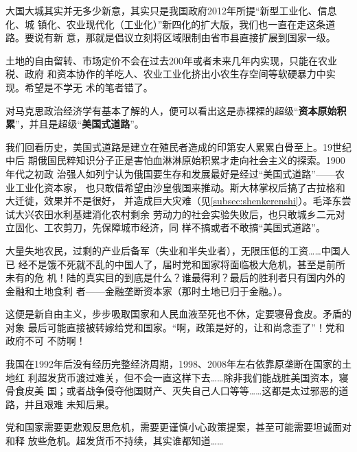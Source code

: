 大国大城其实并无多少新意，其实只是我国政府2012年所提“新型工业化、信息化、城
镇化、农业现代化（工业化）”新四化的扩大版，我们也一直在走这条道路。要说有新
意，那就是倡议立刻将区域限制由省市县直接扩展到国家一级。

土地的自由留转、市场定价不会在过去200年或者未来几年内实现，只能在农业税、政府
和资本协作的羊吃人、农业工业化挤出小农生存空间等软硬暴力中实现。希望是不学无
术的笔者错了。

对马克思政治经济学有基本了解的人，便可以看出这是赤裸裸的超级“\textbf{资本原始积
累}”，并且是超级“\textbf{美国式道路}”。

我们回看历史，美国式道路是建立在殖民者造成的印第安人累累白骨至上。19世纪中后
期俄国民粹知识分子正是害怕血淋淋原始积累才走向社会主义的探索。1900年代之初政
治强人如列宁认为俄国要生存和发展最好是经过“美国式道路”——农业工业化资本家，
也只敢借希望由沙皇俄国来推动。斯大林掌权后搞了古拉格和大迁徙，效果并不是很好，
并造成巨大灾难（见\cref{subsec:shenkerenshi}）。毛泽东尝试大兴农田水利基建消化农村剩余
劳动力的社会实验失败后，也只敢城乡二元对立固化、工农剪刀，先保障城市经济，同
样不搞或者不敢搞“美国式道路”。

大量失地农民，过剩的产业后备军（失业和半失业者），无限压低的工资……中国人已
经不是饿不死就不乱的中国人了，届时党和国家将面临极大危机，甚至是前所未有的危
机！陆的真实目的到底是什么？谁最得利？最后的胜利者只有国内外的金融和土地食利
者——金融垄断资本家（那时土地已归于金融。）。

这便是新自由主义，步步吸取国家和人民血液至死也不休，定要寝骨食皮。矛盾的对象
最后可能直接被转嫁给党和国家。“啊，政策是好的，让和尚念歪了”！党和政府不可
不防啊！

我国在1992年后没有经历完整经济周期，1998、2008年左右依靠原垄断在国家的土地红
利超发货币渡过难关，但不会一直这样下去……除非我们能战胜美国资本，寝骨食皮美
国；或者战争侵夺他国财产、灭失自己人口等等……这都是太过邪恶的道路，并且艰难
未知后果。

党和国家需要更悲观反思危机，需要更谨慎小心政策提案，甚至可能需要坦诚面对和释
放些危机。超发货币不持续，其实谁都知道……




